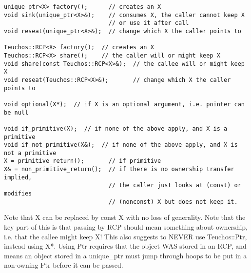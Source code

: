 \begin{lstlisting}
unique_ptr<X> factory();      // creates an X
void sink(unique_ptr<X>&);    // consumes X, the caller cannot keep X 
                              // or use it after call
void reseat(unique_ptr<X>&);  // change which X the caller points to 

Teuchos::RCP<X> factory();  // creates an X
Teuchos::RCP<X> share();    // the caller will or might keep X
void share(const Teuchos::RCP<X>&);  // the callee will or might keep X
void reseat(Teuchos::RCP<X>&);       // change which X the caller points to 

void optional(X*);  // if X is an optional argument, i.e. pointer can be null

void if_primitive(X);  // if none of the above apply, and X is a primitive 
void if_not_primitive(X&);  // if none of the above apply, and X is not a primitive
X = primitive_return();       // if primitive
X& = non_primitive_return();  // if there is no ownership transfer implied,
                              // the caller just looks at (const) or modifies 
                              // (nonconst) X but does not keep it.
\end{lstlisting}


Note that X can be replaced by const X with no loss of generality.
Note that the key part of this is that passing by RCP should mean something about ownership, 
i.e. that the callee might keep X! 
This also suggests to NEVER use Teuchos::Ptr, instead using X*. 
Using Ptr requires that the object WAS stored in an RCP, and means an object stored in 
a unique\_ptr must jump through hoops to be put in a non-owning Ptr before it can be passed.


